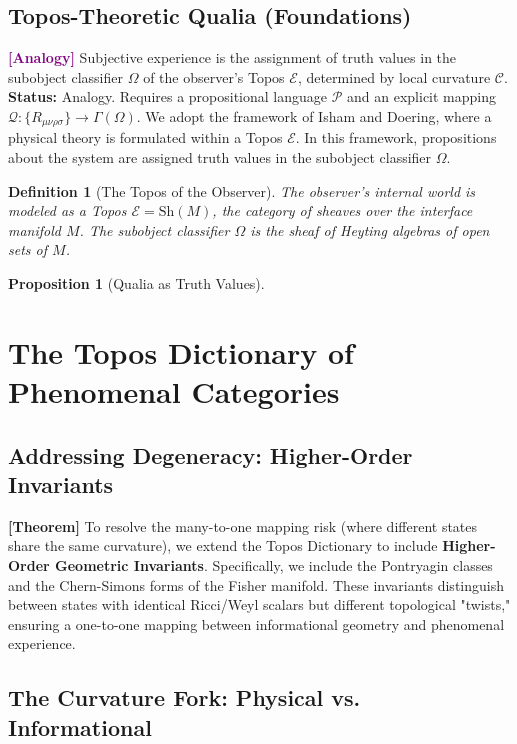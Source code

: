 \documentclass[11pt,titlepage]{article}
\newcommand{\curvature}{\mathcal{C}}
\newcommand{\topos}{\mathcal{E}}
\newcommand{\classifier}{\Omega}
\newcommand{\tagtheo}{\textcolor{green!60!black}{\textbf{[Theorem]}} }
\newcommand{\taganal}{\textcolor{purple}{\textbf{[Analogy]}} }
\newtheorem{proposition}{Proposition}[section]
\newtheorem{definition}{Definition}[section]
\begin{document}
\subsection{Topos-Theoretic Qualia (Foundations)}
\taganal Subjective experience is the assignment of truth values in the subobject classifier $\classifier$ of the observer's Topos $\topos$, determined by local curvature $\curvature$.
\textbf{Status:} Analogy. Requires a propositional language $\mathcal{P}$ and an explicit mapping $\mathcal{Q}: \{R_{\mu\nu\rho\sigma}\} \to \Gamma(\Omega)$. We adopt the framework of Isham and Doering, where a physical theory is formulated within a Topos $\topos$. In this framework, propositions about the system are assigned truth values in the subobject classifier $\classifier$.

\begin{definition}[The Topos of the Observer]
The observer's internal world is modeled as a Topos $\topos = \text{Sh}(M)$, the category of sheaves over the interface manifold $M$. The subobject classifier $\classifier$ is the sheaf of Heyting algebras of open sets of $M$.
\end{definition}

\begin{proposition}[Qualia as Truth Values]

\end{proposition}


\section{The Topos Dictionary of Phenomenal Categories}
\subsection{Addressing Degeneracy: Higher-Order Invariants}
\tagtheo To resolve the many-to-one mapping risk (where different states share the same curvature), we extend the Topos Dictionary to include \textbf{Higher-Order Geometric Invariants}. Specifically, we include the Pontryagin classes and the Chern-Simons forms of the Fisher manifold. These invariants distinguish between states with identical Ricci/Weyl scalars but different topological "twists," ensuring a one-to-one mapping between informational geometry and phenomenal experience.


\subsection{The Curvature Fork: Physical vs. Informational}
\end{document}
